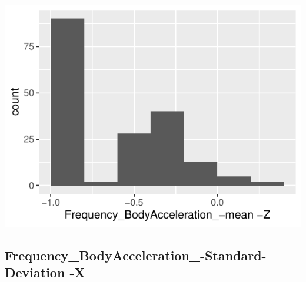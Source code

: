 \documentclass[
]{article}
\begin{document}
\begin{minipage}{0.25 \textwidth}

\includegraphics{codebook_tidydatasub_files/figure-latex/Var-45-Frequency-BodyAcceleration--mean--Z-1.pdf}

\end{minipage}

\noindent\makebox[\linewidth]{\rule{\textwidth}{0.4pt}}

\hypertarget{frequency_bodyacceleration_-standard-deviation--x}{%
\subsection{Frequency\_BodyAcceleration\_-Standard-Deviation
-X}\label{frequency_bodyacceleration_-standard-deviation--x}}
\end{document}
